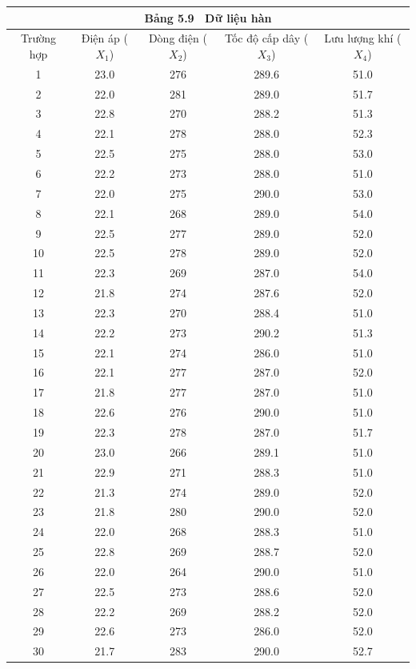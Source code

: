 \begin{center}
\footnotesize
\begin{tabular}{|ccccc|}
\hline
\multicolumn{5}{|p{13cm}|}{\textbf{Bảng 5.9} \ Dữ liệu hàn} \\
\hline
Trường hợp & Điện áp ($X_1$) & Dòng điện ($X_2$) & Tốc độ cấp dây ($X_3$) & Lưu lượng khí ($X_4$) \\
\hline
1 & 23.0 & 276 & 289.6 & 51.0 \\
2 & 22.0 & 281 & 289.0 & 51.7 \\
3 & 22.8 & 270 & 288.2 & 51.3 \\
4 & 22.1 & 278 & 288.0 & 52.3 \\
5 & 22.5 & 275 & 288.0 & 53.0 \\
6 & 22.2 & 273 & 288.0 & 51.0 \\
7 & 22.0 & 275 & 290.0 & 53.0 \\
8 & 22.1 & 268 & 289.0 & 54.0 \\
9 & 22.5 & 277 & 289.0 & 52.0 \\
10 & 22.5 & 278 & 289.0 & 52.0 \\
11 & 22.3 & 269 & 287.0 & 54.0 \\
12 & 21.8 & 274 & 287.6 & 52.0 \\
13 & 22.3 & 270 & 288.4 & 51.0 \\
14 & 22.2 & 273 & 290.2 & 51.3 \\
15 & 22.1 & 274 & 286.0 & 51.0 \\
16 & 22.1 & 277 & 287.0 & 52.0 \\
17 & 21.8 & 277 & 287.0 & 51.0 \\
18 & 22.6 & 276 & 290.0 & 51.0 \\
19 & 22.3 & 278 & 287.0 & 51.7 \\
20 & 23.0 & 266 & 289.1 & 51.0 \\
21 & 22.9 & 271 & 288.3 & 51.0 \\
22 & 21.3 & 274 & 289.0 & 52.0 \\
23 & 21.8 & 280 & 290.0 & 52.0 \\
24 & 22.0 & 268 & 288.3 & 51.0 \\
25 & 22.8 & 269 & 288.7 & 52.0 \\
26 & 22.0 & 264 & 290.0 & 51.0 \\
27 & 22.5 & 273 & 288.6 & 52.0 \\
28 & 22.2 & 269 & 288.2 & 52.0 \\
29 & 22.6 & 273 & 286.0 & 52.0 \\
30 & 21.7 & 283 & 290.0 & 52.7 \\

\end{tabular}
\end{center}
